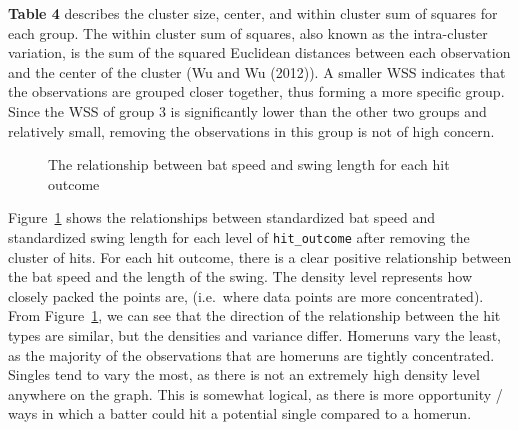\documentclass[
  letterpaper,
  DIV=11,
  numbers=noendperiod]{scrartcl}
\begin{document}
\textbf{Table 4} describes the cluster size, center, and within cluster
sum of squares for each group. The within cluster sum of squares, also
known as the intra-cluster variation, is the sum of the squared
Euclidean distances between each observation and the center of the
cluster (Wu and Wu (2012)). A smaller WSS indicates that the
observations are grouped closer together, thus forming a more specific
group. Since the WSS of group 3 is significantly lower than the other
two groups and relatively small, removing the observations in this group
is not of high concern.

\begin{figure}[H]


\caption{\label{fig-no-b-den}The relationship between bat speed and
swing length for each hit outcome}

\end{figure}%

Figure~\ref{fig-no-b-den} shows the relationships between standardized
bat speed and standardized swing length for each level of
\texttt{hit\_outcome} after removing the cluster of hits. For each hit
outcome, there is a clear positive relationship between the bat speed
and the length of the swing. The density level represents how closely
packed the points are, (i.e.~where data points are more concentrated).
From Figure~\ref{fig-no-b-den}, we can see that the direction of the
relationship between the hit types are similar, but the densities and
variance differ. Homeruns vary the least, as the majority of the
observations that are homeruns are tightly concentrated. Singles tend to
vary the most, as there is not an extremely high density level anywhere
on the graph. This is somewhat logical, as there is more opportunity /
ways in which a batter could hit a potential single compared to a
homerun.
\end{document}
